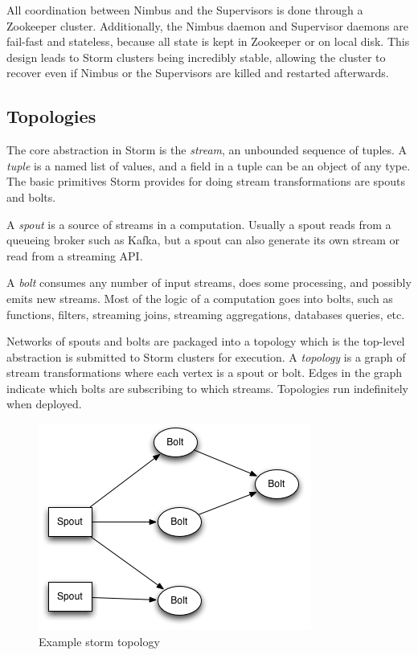 All coordination between Nimbus and the Supervisors is done through a Zookeeper cluster. Additionally, the Nimbus daemon and Supervisor daemons are fail-fast and stateless, because all state is kept in Zookeeper or on local disk. This design leads to Storm clusters being incredibly stable, allowing the cluster to recover even if Nimbus or the Supervisors are killed and restarted afterwards.

\subsection{Topologies}

The core abstraction in Storm is the \emph{stream}, an unbounded sequence of tuples. A \emph{tuple} is a named list of values, and a field in a tuple can be an object of any type. The basic primitives Storm provides for doing stream transformations are spouts and bolts.

A \emph{spout} is a source of streams in a computation. Usually a spout reads from a queueing broker such as Kafka, but a spout can also generate its own stream or read from a streaming API.

A \emph{bolt} consumes any number of input streams, does some processing, and possibly emits new streams.  Most of the logic of a computation goes into bolts, such as functions, filters, streaming joins, streaming aggregations, databases queries, etc.

Networks of spouts and bolts are packaged into a topology which is the top-level abstraction is submitted to Storm clusters for execution. A \emph{topology} is a graph of stream transformations where each vertex is a spout or bolt. Edges in the graph indicate which bolts are subscribing to which streams. Topologies run indefinitely when deployed.

\begin{figure}[H]
\centering
\includegraphics{figures/storm_topology}
\caption{Example storm topology}
\label{figure:storm_topology}
\end{figure}

